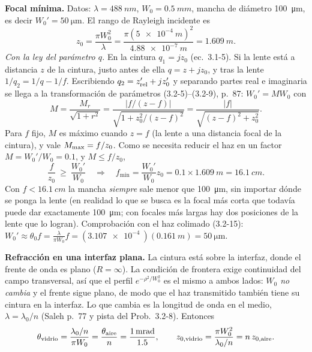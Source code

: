  \textbf{Focal mínima.} Datos: $\lambda=\SI{488}{nm}$, $W_0=\SI{0.5}{mm}$, mancha de diámetro
\SI{100}{\um}, es decir $W_0'=\SI{50}{\um}$. El rango de Rayleigh incidente es
\[
z_0=\frac{\pi W_0^2}{\lambda}=\frac{\pi(\SI{5e-4}{m})^2}{\SI{4.88e-7}{m}}=\SI{1.609}{m}.
\]
\emph{Con la ley del parámetro $q$.} En la cintura $q_1=jz_0$ (ec.~3.1-5). Si la lente está a
distancia $z$ de la cintura, justo antes de ella $q=z+jz_0$, y tras la lente
$1/q_2=1/q-1/f$. Escribiendo $q_2=z'_{\rm rel}+jz_0'$ y separando partes real e imaginaria se llega a
la transformación de parámetros (3.2-5)--(3.2-9), p.~87: $W_0'=MW_0$ con
\[
M=\frac{M_r}{\sqrt{1+r^2}}=\frac{|f/(z-f)|}{\sqrt{1+z_0^2/(z-f)^2}}=\frac{|f|}{\sqrt{(z-f)^2+z_0^2}} .
\]
Para $f$ fijo, $M$ es máximo cuando $z=f$ (la lente a una distancia focal de la cintura), y vale
$M_{\rm max}=f/z_0$. Como se necesita reducir el haz en un factor $M=W_0'/W_0=0.1$, y $M\le f/z_0$,
\[
\frac{f}{z_0}\ \ge\ \frac{W_0'}{W_0}\quad\Longrightarrow\quad
f_{\min}=\frac{W_0'}{W_0}z_0=0.1\times\SI{1.609}{m}=\SI{16.1}{cm}.
\]
Con $f<\SI{16.1}{cm}$ la mancha \emph{siempre} sale menor que \SI{100}{\um}, sin importar dónde se ponga
la lente (en realidad lo que se busca es la focal más corta que todavía puede dar exactamente
\SI{100}{\um}; con focales más largas hay dos posiciones de la lente que lo logran). Comprobación con el haz colimado (3.2-15):
$W_0'\approx\theta_0f=\frac{\lambda}{\pi W_0}f=(\SI{3.107e-4}{})(\SI{0.161}{m})=\SI{50}{\um}$.

 \textbf{Refracción en una interfaz plana.} La cintura está sobre la interfaz, donde el frente
de onda es plano ($R=\infty$). La condición de frontera exige continuidad del campo transversal, así
que el perfil $e^{-\rho^2/W_0^2}$ es el mismo a ambos lados: \emph{$W_0$ no cambia} y el frente sigue
plano, de modo que el haz transmitido también tiene su cintura en la interfaz. Lo que cambia es la
longitud de onda en el medio, $\lambda=\lambda_0/n$ (Saleh p.~77 y pista del Prob.~3.2-8). Entonces
\[
\theta_{\rm vidrio}=\frac{\lambda_0/n}{\pi W_0}=\frac{\theta_{\rm aire}}{n}=\frac{\SI{1}{mrad}}{1.5},
\qquad
z_{0,\rm vidrio}=\frac{\pi W_0^2}{\lambda_0/n}=n\,z_{0,\rm aire}.
\]


